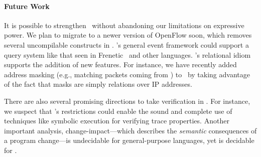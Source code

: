 

%
%
%
%


\paragraph{Future Work}

It is possible to strengthen \flowlog\ without abandoning our limitations on
expressive power. We plan to migrate to a newer version of OpenFlow soon,
which removes several uncompilable constructs in . 
\flowlog's general event framework could support a query system like that seen in
Frenetic~\cite{foster:icfp11-frenetic} and other languages.
\flowlog's relational idiom supports the addition of new features. For instance, we have 
recently added address masking (e.g., matching packets coming from ) to \flowlog\ by 
taking advantage of the fact that masks are simply relations over IP addresses. 

There are also several promising directions to take verification in \flowlog. 
For instance, we suspect that \flowlog's restrictions
could enable the sound and complete use of techniques like symbolic execution
for verifying trace properties.
Another important analysis, change-impact---which describes the
\emph{semantic} consequences of a program change---is undecidable for
general-purpose languages, yet is decidable for \flowlog.


